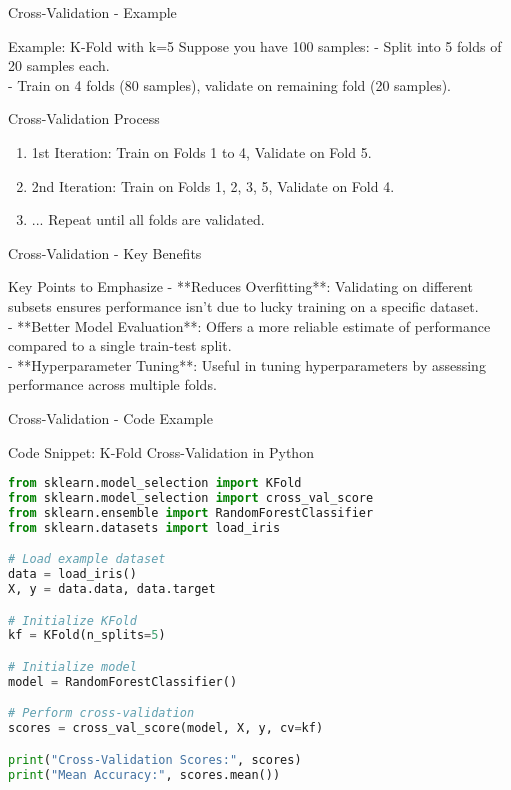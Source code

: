 \documentclass[aspectratio=169]{beamer}
\begin{document}
\begin{frame}[fragile]{Cross-Validation - Example}
    \begin{block}{Example: K-Fold with k=5}
        Suppose you have 100 samples:
        - Split into 5 folds of 20 samples each.\\
        - Train on 4 folds (80 samples), validate on remaining fold (20 samples).
    \end{block}

    \begin{block}{Cross-Validation Process}
        \begin{enumerate}
            \item 1st Iteration: Train on Folds 1 to 4, Validate on Fold 5.
            \item 2nd Iteration: Train on Folds 1, 2, 3, 5, Validate on Fold 4.
            \item ... Repeat until all folds are validated.
        \end{enumerate}
    \end{block}
\end{frame}

\begin{frame}[fragile]{Cross-Validation - Key Benefits}
    \begin{block}{Key Points to Emphasize}
        - **Reduces Overfitting**: Validating on different subsets ensures performance isn't due to lucky training on a specific dataset.\\
        - **Better Model Evaluation**: Offers a more reliable estimate of performance compared to a single train-test split.\\
        - **Hyperparameter Tuning**: Useful in tuning hyperparameters by assessing performance across multiple folds.
    \end{block}
\end{frame}

\begin{frame}[fragile]{Cross-Validation - Code Example}
    \begin{block}{Code Snippet: K-Fold Cross-Validation in Python}
        \begin{lstlisting}[language=Python]
from sklearn.model_selection import KFold
from sklearn.model_selection import cross_val_score
from sklearn.ensemble import RandomForestClassifier
from sklearn.datasets import load_iris

# Load example dataset
data = load_iris()
X, y = data.data, data.target

# Initialize KFold
kf = KFold(n_splits=5)

# Initialize model
model = RandomForestClassifier()

# Perform cross-validation
scores = cross_val_score(model, X, y, cv=kf)

print("Cross-Validation Scores:", scores)
print("Mean Accuracy:", scores.mean())
        \end{lstlisting}
    \end{block}
\end{frame}
\end{document}
